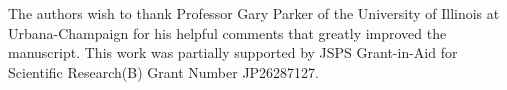 
\acknowledgments

The authors wish to thank Professor Gary Parker of the University of Illinois at Urbana-Champaign for his helpful comments that greatly improved the manuscript. This work was partially supported by JSPS Grant-in-Aid for Scientific Research(B) Grant Number JP26287127.
